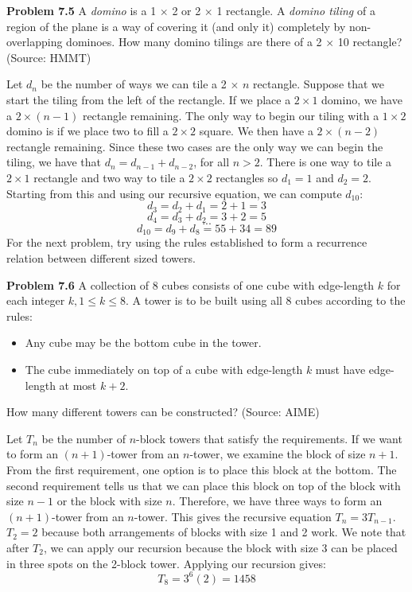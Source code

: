 \documentclass[11pt]{scrartcl}
\begin{document}
\begin{tcolorbox}
\textbf{Problem 7.5} A \textit{domino} is a 1 $\times$ 2 or 2 $\times$ 1 rectangle. A \textit{domino tiling} of a region of the plane is a way of covering it (and only it) completely by non-overlapping dominoes. How many domino tilings are there of a 2 $\times$ 10 rectangle? (Source: HMMT)
\end{tcolorbox}
\noindent 
Let $d_n$ be the number of ways we can tile a 2 $\times$ $n$ rectangle. Suppose that we start the tiling from the left of the rectangle. If we place a $2 \times 1$ domino, we have a $2 \times (n-1)$ rectangle remaining. The only way to begin our tiling with a $1 \times 2$ domino is if we place two to fill a $2 \times 2$ square. We then have a $2 \times (n-2)$ rectangle remaining. Since these two cases are the only way we can begin the tiling, we have that ${d_n}={d_{n-1}}+{d_{n-2}}$, for all $n>2$. There is one way to tile a $2 \times 1$ rectangle and two way to tile a $2 \times 2$ rectangles so ${d_1}=1$ and ${d_2}=2$. Starting from this and using our recursive equation, we can compute $d_{10}$:
$${d_3}={d_2}+{d_1}=2+1=3$$
$${d_4}={d_3}+{d_2}=3+2=5$$
$$...$$
$${d_{10}}={d_9}+{d_8}=55+34=89$$
For the next problem, try using the rules established to form a recurrence relation between different sized towers. 
\\
\begin{tcolorbox}
\textbf{Problem 7.6} A collection of 8 cubes consists of one cube with edge-length $k$ for each integer $k, 1 \le k \le 8.$ A tower is to be built using all 8 cubes according to the rules:
\begin{itemize}
    \item Any cube may be the bottom cube in the tower.
    \item The cube immediately on top of a cube with edge-length $k$ must have edge-length at most $k+2.$
\end{itemize}
How many different towers can be constructed? (Source: AIME)
\end{tcolorbox}
\noindent 
Let $T_n$ be the number of $n$-block towers that satisfy the requirements. If we want to form an $(n+1)$-tower from an $n$-tower, we examine the block of size $n+1$. From the first requirement, one option is to place this block at the bottom. The second requirement tells us that we can place this block on top of the block with size $n-1$ or the block with size $n$. Therefore, we have three ways to form an $(n+1)$-tower from an $n$-tower. This gives the recursive equation ${T_n}=3{T_{n-1}}$. ${T_2}=2$ because both arrangements of blocks with size 1 and 2 work. We note that after $T_2$, we can apply our recursion because the block with size 3 can be placed in three spots on the 2-block tower. Applying our recursion gives:
$${T_8}=3^6(2)=1458$$
\end{document}
